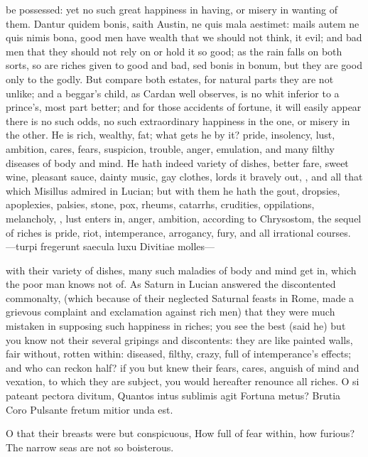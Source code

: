 {be possessed: yet no such great happiness in having, or misery in
wanting of them. Dantur quidem bonis, saith Austin, ne quis mala
aestimet: mails autem ne quis nimis bona, good men have wealth that we
should not think, it evil; and bad men that they should not rely on or
hold it so good; as the rain falls on both sorts, so are riches given
to good and bad, sed bonis in bonum, but they are good only to the
godly. But compare both estates, for natural parts they are not
unlike; and a beggar's child, as Cardan well observes, is no whit
inferior to a prince's, most part better; and for those accidents of
fortune, it will easily appear there is no such odds, no such
extraordinary happiness in the one, or misery in the other. He is rich,
wealthy, fat; what gets he by it? pride, insolency, lust, ambition,
cares, fears, suspicion, trouble, anger, emulation, and many filthy
diseases of body and mind. He hath indeed variety of dishes, better
fare, sweet wine, pleasant sauce, dainty music, gay clothes, lords it
bravely out, \etc{}, and all that which Misillus admired in Lucian;
but with them he hath the gout, dropsies, apoplexies, palsies, stone,
pox, rheums, catarrhs, crudities, oppilations, melancholy, \etc{},
lust enters in, anger, ambition, according to Chrysostom, the
sequel of riches is pride, riot, intemperance, arrogancy, fury, and all
irrational courses.
---turpi fregerunt saecula luxu
Divitiae molles---

with their variety of dishes, many such maladies of body and mind get
in, which the poor man knows not of. As Saturn in Lucian answered
the discontented commonalty, (which because of their neglected Saturnal
feasts in Rome, made a grievous complaint and exclamation against rich
men) that they were much mistaken in supposing such happiness in
riches; you see the best (said he) but you know not their several
gripings and discontents: they are like painted walls, fair without,
rotten within: diseased, filthy, crazy, full of intemperance's effects;
and who can reckon half? if you but knew their fears, cares,
anguish of mind and vexation, to which they are subject, you would
hereafter renounce all riches.
O si pateant pectora divitum,
Quantos intus sublimis agit
Fortuna metus? Brutia Coro
Pulsante fretum mitior unda est.

O that their breasts were but conspicuous,
How full of fear within, how furious?
The narrow seas are not so boisterous.

}

